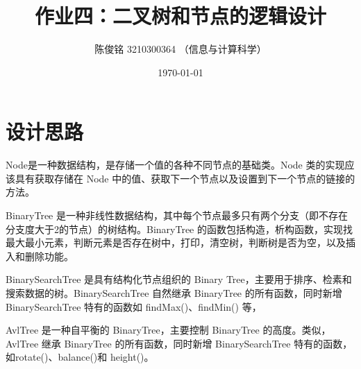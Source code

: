 \documentclass[a4paper]{article}
\title{作业四：二叉树和节点的逻辑设计}
\author{陈俊铭 3210300364 （信息与计算科学）}
\date{\today}
\begin{document}
\maketitle
\section*{设计思路}
Node是一种数据结构，是存储一个值的各种不同节点的基础类。Node 类的实现应该具有获取存储在 Node 中的值、获取下一个节点以及设置到下一个节点的链接的方法。

BinaryTree 是一种非线性数据结构，其中每个节点最多只有两个分支（即不存在分支度大于2的节点）的树结构。BinaryTree 的函数包括构造，析构函数，实现找最大最小元素，判断元素是否存在树中，打印，清空树，判断树是否为空，以及插入和删除功能。

BinarySearchTree 是具有结构化节点组织的 Binary Tree，主要用于排序、检素和搜索数据的树。BinarySearchTree 自然继承 BinaryTree 的所有函数，同时新增 BinarySearchTree 特有的函数如 findMax()、findMin() 等，

AvlTree 是一种自平衡的 BinaryTree，主要控制 BinaryTree 的高度。类似，AvlTree 继承 BinaryTree 的所有函数，同时新增 BinarySearchTree 特有的函数，如rotate()、balance()和 height()。
\end{document}
